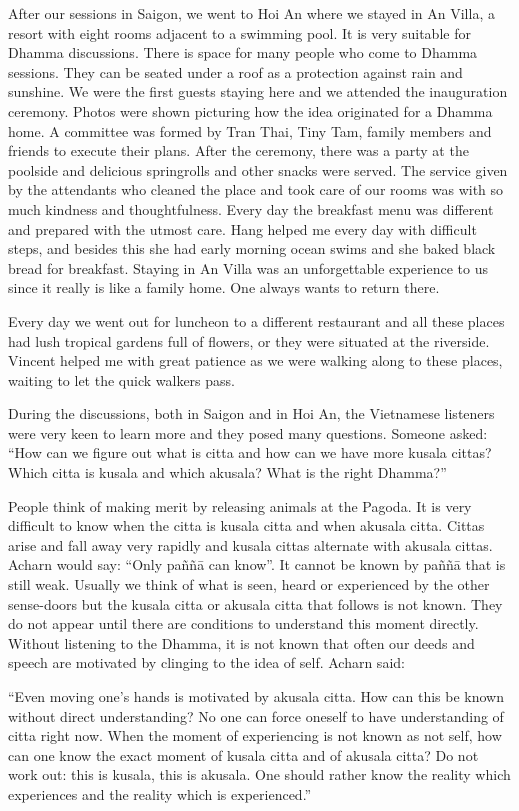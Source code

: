 After our sessions in Saigon, we went to Hoi An where we stayed in An
Villa, a resort with eight rooms adjacent to a swimming pool. It is very
suitable for Dhamma discussions. There is space for many people who come
to Dhamma sessions. They can be seated under a roof as a protection
against rain and sunshine. We were the first guests staying here and we
attended the inauguration ceremony. Photos were shown picturing how the
idea originated for a Dhamma home. A committee was formed by Tran Thai,
Tiny Tam, family members and friends to execute their plans. After the
ceremony, there was a party at the poolside and delicious springrolls
and other snacks were served. The service given by the attendants who
cleaned the place and took care of our rooms was with so much kindness
and thoughtfulness. Every day the breakfast menu was different and
prepared with the utmost care. Hang helped me every day with difficult
steps, and besides this she had early morning ocean swims and she baked
black bread for breakfast. Staying in An Villa was an unforgettable
experience to us since it really is like a family home. One always wants
to return there.

Every day we went out for luncheon to a different restaurant and all
these places had lush tropical gardens full of flowers, or they were
situated at the riverside. Vincent helped me with great patience as we
were walking along to these places, waiting to let the quick walkers
pass.

During the discussions, both in Saigon and in Hoi An, the Vietnamese
listeners were very keen to learn more and they posed many questions.
Someone asked: ``How can we figure out what is citta and how can we have
more kusala cittas? Which citta is kusala and which akusala? What is the
right Dhamma?''

People think of making merit by releasing animals at the Pagoda. It is
very difficult to know when the citta is kusala citta and when akusala
citta. Cittas arise and fall away very rapidly and kusala cittas
alternate with akusala cittas. Acharn would say: ``Only paññā can
know''. It cannot be known by paññā that is still weak. Usually we think
of what is seen, heard or experienced by the other sense-doors but the
kusala citta or akusala citta that follows is not known. They do not
appear until there are conditions to understand this moment directly.
Without listening to the Dhamma, it is not known that often our deeds
and speech are motivated by clinging to the idea of self. Acharn said:

``Even moving one's hands is motivated by akusala citta. How can this be
known without direct understanding? No one can force oneself to have
understanding of citta right now. When the moment of experiencing is not
known as not self, how can one know the exact moment of kusala citta and
of akusala citta? Do not work out: this is kusala, this is akusala. One
should rather know the reality which experiences and the reality which
is experienced.''

